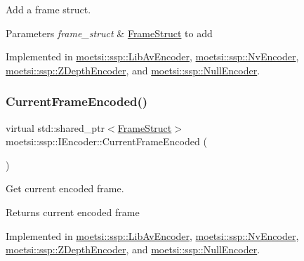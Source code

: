Add a frame struct. 


\begin{DoxyParams}{Parameters}
{\em frame\+\_\+struct} & \hyperlink{structmoetsi_1_1ssp_1_1FrameStruct}{Frame\+Struct} to add \\
\hline
\end{DoxyParams}


Implemented in \hyperlink{classmoetsi_1_1ssp_1_1LibAvEncoder_a931327f154e0da63fdfed73cf317d688}{moetsi\+::ssp\+::\+Lib\+Av\+Encoder}, \hyperlink{classmoetsi_1_1ssp_1_1NvEncoder_a99fbcbd5f04c5b3b395167badbf84b2f}{moetsi\+::ssp\+::\+Nv\+Encoder}, \hyperlink{classmoetsi_1_1ssp_1_1ZDepthEncoder_a382e94eab7789cb4437b9711e5292343}{moetsi\+::ssp\+::\+Z\+Depth\+Encoder}, and \hyperlink{classmoetsi_1_1ssp_1_1NullEncoder_a05f90c640c372d00f45173ec3e9436be}{moetsi\+::ssp\+::\+Null\+Encoder}.

\mbox{\label{classmoetsi_1_1ssp_1_1IEncoder_a178d117518e7c7007414ea9c82bd3ed6}} 
\subsubsection{\texorpdfstring{Current\+Frame\+Encoded()}{CurrentFrameEncoded()}\hspace{0.1cm}{\footnotesize\ttfamily [1/2]}}
{\footnotesize\ttfamily virtual std\+::shared\+\_\+ptr$<$\hyperlink{structmoetsi_1_1ssp_1_1FrameStruct}{Frame\+Struct}$>$ moetsi\+::ssp\+::\+I\+Encoder\+::\+Current\+Frame\+Encoded (\begin{DoxyParamCaption}{ }\end{DoxyParamCaption})\hspace{0.3cm}{\ttfamily [pure virtual]}}



Get current encoded frame. 

\begin{DoxyReturn}{Returns}
current encoded frame 
\end{DoxyReturn}


Implemented in \hyperlink{classmoetsi_1_1ssp_1_1LibAvEncoder_aedb37703d73b55f1389a122d2ecbe923}{moetsi\+::ssp\+::\+Lib\+Av\+Encoder}, \hyperlink{classmoetsi_1_1ssp_1_1NvEncoder_adbc7d498e797af8c5bb31b5a2a82efdd}{moetsi\+::ssp\+::\+Nv\+Encoder}, \hyperlink{classmoetsi_1_1ssp_1_1ZDepthEncoder_a075752f62bbc40f71026812c5548ef5f}{moetsi\+::ssp\+::\+Z\+Depth\+Encoder}, and \hyperlink{classmoetsi_1_1ssp_1_1NullEncoder_ae48926f99c368849ee8822aed10ac1b5}{moetsi\+::ssp\+::\+Null\+Encoder}.

